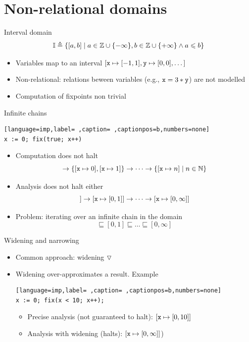 \documentclass[presentation]{beamer}
\begin{document}
\section{Non-relational domains}
\label{sec:orgf95f6b7}
\begin{frame}[label={sec:orga06e8d3}]{Interval domain}
\begin{equation*}
  \Int \defin \{[a,b] \mid a \in \z \cup \{-\infty\}, b\in\z\cup\{+\infty\} \land a \leq b\}
\end{equation*}
\begin{itemize}
\item Variables map to an interval \([\var \mapsto [-1,1], \var[y]
     \mapsto [0,0], \dots]\)
\item \alert{Non-relational}: relations beween variables (e.g., \(\var =
     3*\var[y]\)) are not modelled
\item Computation of fixpoints non trivial
\end{itemize}
\end{frame}
\begin{frame}[label={sec:org2065ba8},fragile]{Infinite chains}
 \begin{lstlisting}[language=imp,label= ,caption= ,captionpos=b,numbers=none]
x := 0; fix(true; x++)
\end{lstlisting}
\begin{itemize}
\item Computation does not halt
\begin{equation*}
  [\var\mapsto 0] \to \{[\var\mapsto 0], [\var\mapsto 1]\} \to \dots \to \{[\var\mapsto n] \mid n\in\n\}
\end{equation*}
\item Analysis does not halt either
\begin{equation*}
  [\var\mapsto[0,0]] \to [\var\mapsto[0,1]] \to \dots \to [\var\mapsto[0,\infty]]
\end{equation*}
\item Problem: iterating over an infinite chain in the domain
\begin{equation*}
  [0,0] \sqsubseteq [0,1] \sqsubseteq \dots \sqsubseteq [0,\infty]
\end{equation*}
\end{itemize}
\end{frame}
\begin{frame}[label={sec:org818476e},fragile]{Widening and narrowing}
 \begin{itemize}
\item Common approach: widening \(\widen\)
\item Widening over-approximates a result. Example
\begin{lstlisting}[language=imp,label= ,caption= ,captionpos=b,numbers=none]
x := 0; fix(x < 10; x++);
\end{lstlisting}
\begin{itemize}
\item \alert{Precise analysis} (not guaranteed to halt): \([\var\mapsto[0,10]]\)
\item \alert{Analysis with widening} (halts): \([\var\mapsto[0,\infty]]\))
\end{itemize}
\end{itemize}
\end{frame}
\end{document}
